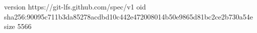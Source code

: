 version https://git-lfs.github.com/spec/v1
oid sha256:90095c711b3da85278acdbd10c442e472008014b50e9865d81bc2ce2b730a54e
size 5566
